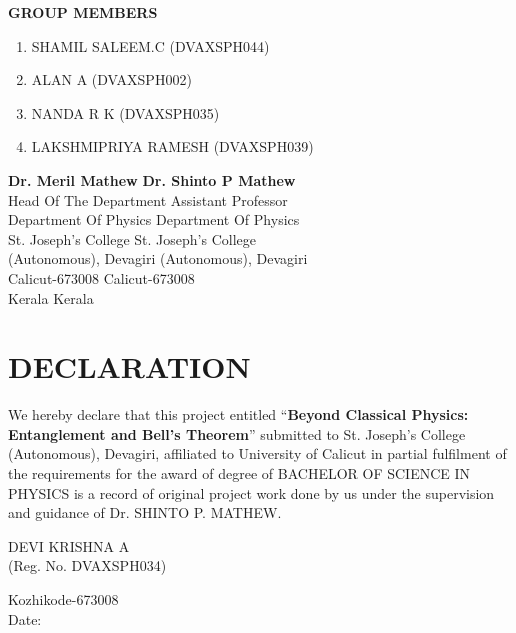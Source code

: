 \documentclass[14pt,a4paper]{extarticle}
\begin{document}
\vspace{1cm}
\noindent \textbf{GROUP MEMBERS}
\begin{enumerate}
\item SHAMIL SALEEM.C (DVAXSPH044)
\item ALAN A (DVAXSPH002)
\item NANDA R K (DVAXSPH035)
\item LAKSHMIPRIYA RAMESH (DVAXSPH039)
\end{enumerate}


\vfill

\begin{flushleft}
\textbf{Dr. Meril Mathew} \hfill \textbf{Dr. Shinto P Mathew}\\
Head Of The Department \hfill Assistant Professor\\
Department Of Physics \hfill Department Of Physics\\
St. Joseph's College \hfill St. Joseph's College\\
(Autonomous), Devagiri \hfill (Autonomous), Devagiri\\
Calicut-673008 \hfill Calicut-673008\\
Kerala \hfill Kerala
\end{flushleft}

\newpage
\vspace*{\fill}
\section*{\centering DECLARATION}
\justifying

We hereby declare that this project entitled “\textbf{Beyond Classical Physics: Entanglement and Bell's Theorem}” submitted to St. Joseph’s College (Autonomous), Devagiri, affiliated to University of Calicut in partial fulfilment of the requirements for the award of degree of BACHELOR OF SCIENCE IN PHYSICS is a record of original project work done by us under the supervision and guidance of Dr. SHINTO P. MATHEW.

\vspace{2cm}

\begin{flushright}
DEVI KRISHNA A\\
(Reg. No. DVAXSPH034)
\end{flushright}

\vspace{1cm}

\noindent Kozhikode-673008\\
Date:
\vspace*{\fill}
\newpage
\vspace*{\fill}
\end{document}
